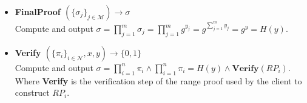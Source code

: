 \begin{algorithm}
\begin{itemize}
\item\textbf{FinalProof $(\{\sigma_j\}_{j\in\mathcal{M}})\xrightarrow[]{}\sigma$}\\
Compute and output $\sigma = \prod_{j=1}^m \sigma_j = \prod_{j=1}^m g^{y_{j}} =  g^{\sum_{j=1}^m y_{j}}= g^{y}=H(y)$.

\item\textbf{Verify $(\{\pi_i\}_{i\in\mathcal{N}},x,y)\xrightarrow[]{}\{0,1\}$}\\
Compute and output $\sigma= \prod_{i=1}^n \pi_i \wedge \prod_{i=1}^n \pi_i = H(y)\wedge \textbf{Verify}(RP_i)$. Where \textbf{Verify} is the verification step of the range proof used by the client to construct $RP_i$.
\end{itemize}
\label{alg:VAHSS-HSS-RP}
\end{algorithm}



